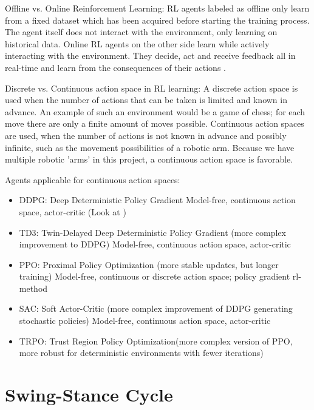 Offline vs. Online Reinforcement Learning: 
RL agents labeled as offline only learn from a fixed dataset which has been acquired before starting the training process.
The agent itself does not interact with the environment, only learning on historical data.
Online RL agents on the other side learn while actively interacting with the environment.
They decide, act and receive feedback all in real-time and learn from the consequences of their actions \parencite{schrittwieser2021online}.



Discrete vs. Continuous action space in RL learning: 
A discrete action space is used when the number of actions that can be taken is limited and known in advance. An example of such an environment would be a game of chess; for each move there are only a finite amount of moves possible.
Continuous action spaces are used, when the number of actions is not known in advance and possibly infinite, such as the movement possibilities of a robotic arm.
Because we have multiple robotic 'arms' in this project, a continuous action space is favorable.



Agents applicable for continuous action spaces: 
\begin{itemize}		
	\item DDPG: Deep Deterministic Policy Gradient
	Model-free, continuous action space, actor-critic (Look at \parencite{trotta2022walking})
	\item TD3: Twin-Delayed Deep Deterministic Policy Gradient (more complex improvement to DDPG)
	Model-free, continuous action space, actor-critic
	\item PPO: Proximal Policy Optimization (more stable updates, but longer training)
	Model-free, continuous or discrete action space; policy gradient rl-method
	\item SAC: Soft Actor-Critic (more complex improvement of DDPG generating stochastic policies)
	Model-free, continuous action space, actor-critic
	\item TRPO: Trust Region Policy Optimization(more complex version of PPO, more robust for deterministic environments with fewer iterations)
\end{itemize}\parencite{MATLAB}


\section{Swing-Stance Cycle}
